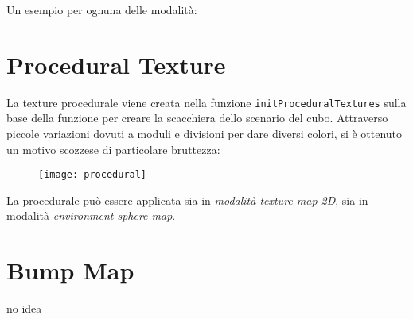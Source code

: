 Un esempio per ognuna delle modalità:
\begin{figure}[hbt]
    \centering
    \vspace{-0.5cm}
	\vspace{-0.5cm}
\end{figure}

\newpage
\section{Procedural Texture}
La texture procedurale viene creata nella funzione \texttt{initProceduralTextures} sulla base della funzione per creare la scacchiera dello scenario del cubo. Attraverso piccole variazioni dovuti a moduli e divisioni per dare diversi colori, si è ottenuto un motivo scozzese di particolare bruttezza:\\
 \begin{figure}[htb]
    \centering
    \texttt{[image: procedural]}
    \caption*{\label{fig:procedural}}
\end{figure}

La procedurale può essere applicata sia in \textit{modalità texture map 2D}, sia in modalità \textit{environment sphere map}.


\newpage

\section{Bump Map}

no idea





















%